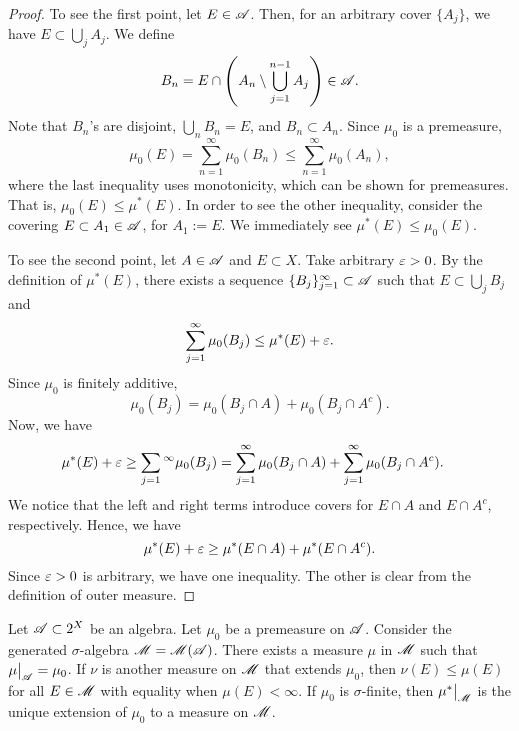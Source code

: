 \documentclass[12pt]{article} %
\begin{document}
\begin{proof}
    To see the first point, let $E \in \mathscr{A}$. Then, for an arbitrary cover $\{A_j\}$, we have $E \subset \bigcup_j A_j$. We define \[B_n = E \cap \left(A_n \setminus \bigcup_{j=1}^{n-1} A_{j} \right) \in \mathscr{A}.\] Note that $B_n$'s are disjoint, $\bigcup_n B_n = E$, and $B_n \subset A_n$. Since $\mu_0$ is a premeasure, \[\mu_0(E) = \sum_{n=1}^{\infty} \mu_0(B_n) \leq \sum_{n=1}^{\infty} \mu_0(A_n),\] where the last inequality uses monotonicity, which can be shown for premeasures. That is, $\mu_0(E) \leq \mu^*(E)$. In order to see the other inequality, consider the covering $E \subset A_1 \in \mathscr{A}$, for $A_1 := E$. We immediately see $\mu^*(E) \leq \mu_0(E)$.

    To see the second point, let $A \in \mathscr{A}$ and $E \subset X$. Take arbitrary $\varepsilon > 0$. By the definition of $\mu^*(E)$, there exists a sequence $\{B_j\}_{j=1}^{\infty} \subset \mathscr{A}$ such that $E \subset \bigcup_j B_j$ and \[\sum_{j=1}^{\infty} \mu_0(B_j) \leq \mu^*(E) + \varepsilon.\] Since $\mu_0$ is finitely additive, \[\mu_0(B_j) = \mu_0(B_j \cap A) + \mu_0(B_j \cap A^c).\] Now, we have \begin{align*}
        \mu^*(E) + \varepsilon \geq \sum_{j=1}{^\infty} \mu_0(B_j) &= \sum_{j=1}^{\infty} \mu_0(B_j \cap A) + \sum_{j=1}^{\infty} \mu_0(B_j \cap A^c).
    \end{align*}
    We notice that the left and right terms introduce covers for $E \cap A$ and $E \cap A^c$, respectively. Hence, we have \[\mu^*(E) + \varepsilon \geq \mu^*(E \cap A) + \mu^*(E \cap A^c).\] Since $\varepsilon > 0$ is arbitrary, we have one inequality. The other is clear from the definition of outer measure.
\end{proof}

\begin{theorem}\label{thm:premeasure-induced-measure}
    Let $\mathscr{A} \subset 2^X$ be an algebra. Let $\mu_0$ be a premeasure on $\mathscr{A}$. Consider the generated $\sigma$-algebra $\mathscr{M} = \mathscr{M}(\mathscr{A})$. There exists a measure $\mu$ in $\mathscr{M}$ such that $\restr{\mu}{\SA} = \mu_0$. If $\nu$ is another measure on $\mathscr{M}$ that extends $\mu_0$, then $\nu(E) \leq \mu(E)$ for all $E \in \mathscr{M}$ with equality when $\mu(E) < \infty$. If $\mu_0$ is $\sigma$-finite, then $\restr{\mu^*}{\SM}$ is the unique extension of $\mu_0$ to a measure on $\mathscr{M}$. 
\end{theorem}
\end{document}
